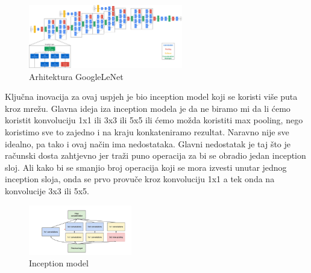 \FloatBarrier
\begin{figure}[h]
    \centering
    \includegraphics[width=0.6\textwidth]{images/GoogLeNet}
    \caption{Arhitektura GoogleLeNet
    \protect\footnotemark}
    \label{fig:slika11}
\end{figure}
\FloatBarrier
{}

Ključna inovacija za ovaj uspjeh je bio inception model koji se koristi više puta kroz mrežu.
Glavna ideja iza inception modela je da ne biramo mi da li ćemo koristit konvoluciju 1x1 ili 3x3 ili 5x5 ili ćemo možda koristiti max pooling, nego koristimo sve to zajedno i na kraju konkateniramo rezultat.
Naravno nije sve idealno, pa tako i ovaj način ima nedostataka.
Glavni nedostatak je taj što je računski dosta zahtjevno jer traži puno operacija za bi se obradio jedan inception sloj.
Ali kako bi se smanjio broj operacija koji se mora izvesti unutar jednog inception sloja, onda se prvo provuče kroz konvoluciju 1x1 a tek onda na konvolucije 3x3 ili 5x5.

\FloatBarrier
\begin{figure}[h]
    \centering
    \includegraphics[width=0.4\textwidth]{images/Inception}
    \caption{Inception model
    \protect\footnotemark}
    \label{fig:slika12}
\end{figure}
\FloatBarrier
{}
